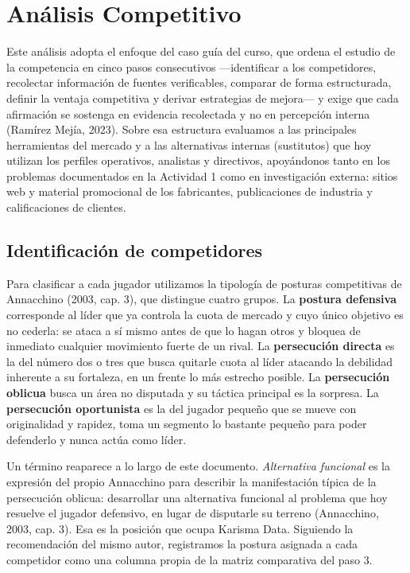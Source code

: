 \section{Análisis Competitivo}

Este análisis adopta el enfoque del caso guía del curso, que ordena el estudio de la competencia en cinco pasos consecutivos —identificar a los competidores, recolectar información de fuentes verificables, comparar de forma estructurada, definir la ventaja competitiva y derivar estrategias de mejora— y exige que cada afirmación se sostenga en evidencia recolectada y no en percepción interna (Ramírez Mejía, 2023). Sobre esa estructura evaluamos a las principales herramientas del mercado y a las alternativas internas (sustitutos) que hoy utilizan los perfiles operativos, analistas y directivos, apoyándonos tanto en los problemas documentados en la Actividad 1 como en investigación externa: sitios web y material promocional de los fabricantes, publicaciones de industria y calificaciones de clientes.

\subsection{Identificación de competidores}

Para clasificar a cada jugador utilizamos la tipología de posturas competitivas de Annacchino (2003, cap. 3), que distingue cuatro grupos. La \textbf{postura defensiva} corresponde al líder que ya controla la cuota de mercado y cuyo único objetivo es no cederla: se ataca a sí mismo antes de que lo hagan otros y bloquea de inmediato cualquier movimiento fuerte de un rival. La \textbf{persecución directa} es la del número dos o tres que busca quitarle cuota al líder atacando la debilidad inherente a su fortaleza, en un frente lo más estrecho posible. La \textbf{persecución oblicua} busca un área no disputada y su táctica principal es la sorpresa. La \textbf{persecución oportunista} es la del jugador pequeño que se mueve con originalidad y rapidez, toma un segmento lo bastante pequeño para poder defenderlo y nunca actúa como líder.

Un término reaparece a lo largo de este documento. \textit{Alternativa funcional} es la expresión del propio Annacchino para describir la manifestación típica de la persecución oblicua: desarrollar una alternativa funcional al problema que hoy resuelve el jugador defensivo, en lugar de disputarle su terreno (Annacchino, 2003, cap. 3). Esa es la posición que ocupa Karisma Data. Siguiendo la recomendación del mismo autor, registramos la postura asignada a cada competidor como una columna propia de la matriz comparativa del paso 3.

